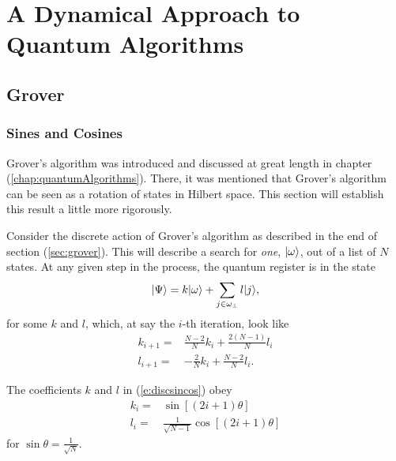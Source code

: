 
\chapter{A Dynamical Approach to Quantum Algorithms}
\label{chap:dynamics}
%

\section{Grover}

\subsection{Sines and Cosines}
\label{ssec:sincos}

Grover's algorithm was introduced and discussed at great length in
chapter (\ref{chap:quantumAlgorithms}).  There, it was mentioned that
Grover's algorithm can be seen as a rotation of states in Hilbert
space.  This section will establish this result a little more rigorously.

Consider the discrete action of Grover's algorithm as described in the end of
section (\ref{sec:grover}).  This will describe a search for \emph{one},
${|{\omega}\rangle}$,
out of a list of $N$ states.  At any given step in the process, the
quantum register is in the state
\begin{equation}
{|{\Psi}\rangle} = k{|{\omega}\rangle} + \sum_{j\in\omega_\perp}l{|{j}\rangle},
\end{equation}
for some $k$ and $l$, which, at say the $i$-th iteration, 
look like
\begin{equation}
\begin{split}
k_{i+1} =& \frac{N-2}{N}k_i + \frac{2(N-1)}{N}l_i\\
l_{i+1} =& -\frac{2}{N}k_i + \frac{N-2}{N}l_i.
\end{split}
\label{e:discsincos}
\end{equation}

\begin{prop}
The coefficients $k$ and $l$ in (\ref{e:discsincos}) obey
\begin{equation}
\begin{split}
k_i =& \sin\left[\left(2i+1\right)\theta\right]\\
l_i =& \frac{1}{\sqrt{N-1}}\cos\left[\left(2i+1\right)\theta\right]
\end{split}
\label{e:sincos}
\end{equation}
for $\sin\theta = \frac{1}{\sqrt{N}}$.
\end{prop}

